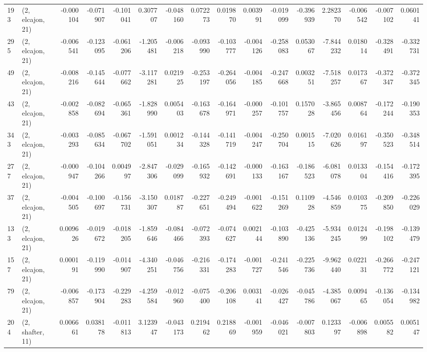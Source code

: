 \begin{tabular}{llrrrrrrrrrrrrrr}
193 &  (2, elcajon, 21) &  -0.000104 & -0.071907 & -0.101041 &     0.307707 &  -0.048160 &   0.072273 &   0.019870 &  0.003991 & -0.019099 & -0.396939 &    2.282370 & -0.006542 & -0.007102 &  0.060141 \\
295 &  (2, elcajon, 21) &  -0.006541 & -0.123095 & -0.061206 &    -1.205481 &  -0.006218 &  -0.093990 &  -0.103777 & -0.004126 & -0.258083 &  0.053067 &   -7.844232 &  0.018014 & -0.328491 & -0.332731 \\
49  &  (2, elcajon, 21) &  -0.008216 & -0.145644 & -0.077662 &    -3.117281 &   0.021925 &  -0.253197 &  -0.264056 & -0.004185 & -0.247668 &  0.003251 &   -7.518257 &  0.017367 & -0.372347 & -0.372345 \\
43  &  (2, elcajon, 21) &  -0.002858 & -0.082694 & -0.065361 &    -1.828990 &   0.005403 &  -0.163678 &  -0.164971 & -0.000257 & -0.101757 &  0.157028 &   -3.865456 &  0.008764 & -0.172244 & -0.190353 \\
343 &  (2, elcajon, 21) &  -0.003293 & -0.085634 & -0.067702 &    -1.591051 &   0.001234 &  -0.144328 &  -0.141719 & -0.004247 & -0.250704 &  0.001515 &   -7.020626 &  0.016197 & -0.350523 & -0.348514 \\
277 &  (2, elcajon, 21) &  -0.000947 & -0.104266 &  0.004997 &    -2.847306 &  -0.029099 &  -0.165932 &  -0.142691 & -0.000133 & -0.163167 & -0.186523 &   -6.081078 &  0.013304 & -0.154416 & -0.172395 \\
37  &  (2, elcajon, 21) &  -0.004505 & -0.100697 & -0.156731 &    -3.150307 &   0.018787 &  -0.227651 &  -0.249494 & -0.001622 & -0.151269 &  0.110928 &   -4.546859 &  0.010375 & -0.209850 & -0.226029 \\
133 &  (2, elcajon, 21) &   0.009626 & -0.019672 & -0.018205 &    -1.859646 &  -0.084466 &  -0.072393 &  -0.074627 &  0.002144 & -0.103890 & -0.425136 &   -5.934245 &  0.012499 & -0.198102 & -0.139479 \\
157 &  (2, elcajon, 21) &   0.000191 & -0.119990 & -0.014907 &    -4.340251 &  -0.046756 &  -0.216331 &  -0.174283 & -0.001727 & -0.241546 & -0.225736 &   -9.962440 &  0.022131 & -0.266772 & -0.247121 \\
79  &  (2, elcajon, 21) &  -0.006857 & -0.173904 & -0.229283 &    -4.259584 &  -0.012960 &  -0.075400 &  -0.206108 &  0.003141 & -0.026427 & -0.045786 &   -4.385067 &  0.009465 & -0.136054 & -0.134982 \\
204 &  (2, shafter, 11) &   0.006661 &  0.038178 & -0.011813 &     3.123947 &  -0.043173 &   0.219462 &   0.218869 & -0.001959 & -0.046021 & -0.007803 &    0.123397 & -0.006898 &  0.005582 &  0.005147 \\

\end{tabular}
